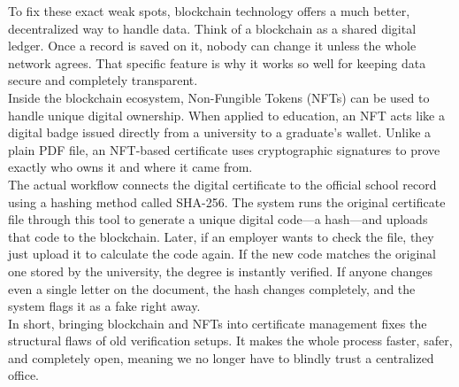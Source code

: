 To fix these exact weak spots, blockchain technology offers a much better, decentralized way to handle data. Think of a blockchain as a shared digital ledger. Once a record is saved on it, nobody can change it unless the whole network agrees. That specific feature is why it works so well for keeping data secure and completely transparent.\\

Inside the blockchain ecosystem, Non-Fungible Tokens (NFTs) can be used to handle unique digital ownership. When applied to education, an NFT acts like a digital badge issued directly from a university to a graduate's wallet. Unlike a plain PDF file, an NFT-based certificate uses cryptographic signatures to prove exactly who owns it and where it came from.\\

The actual workflow connects the digital certificate to the official school record using a hashing method called SHA-256. The system runs the original certificate file through this tool to generate a unique digital code—a hash—and uploads that code to the blockchain. Later, if an employer wants to check the file, they just upload it to calculate the code again. If the new code matches the original one stored by the university, the degree is instantly verified. If anyone changes even a single letter on the document, the hash changes completely, and the system flags it as a fake right away.\\

In short, bringing blockchain and NFTs into certificate management fixes the structural flaws of old verification setups. It makes the whole process faster, safer, and completely open, meaning we no longer have to blindly trust a centralized office.
